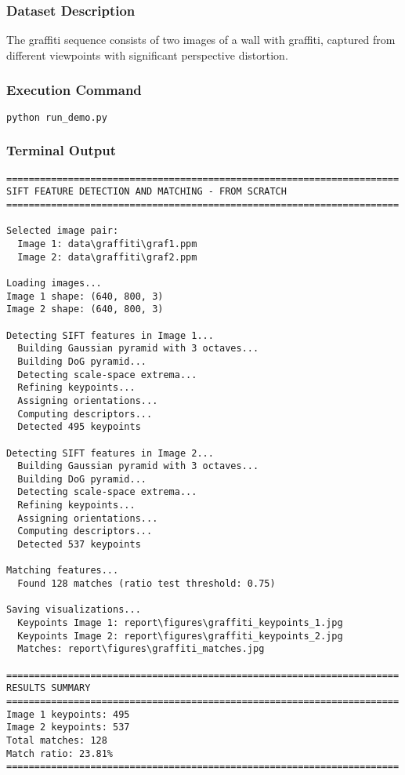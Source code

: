 \documentclass[12pt,a4paper]{article}
\begin{document}
\subsubsection{Dataset Description}
The graffiti sequence consists of two images of a wall with graffiti, captured from different viewpoints with significant perspective distortion.

\subsubsection{Execution Command}
\begin{lstlisting}[language=bash]
python run_demo.py
\end{lstlisting}

\subsubsection{Terminal Output}
\begin{lstlisting}
======================================================================
SIFT FEATURE DETECTION AND MATCHING - FROM SCRATCH
======================================================================

Selected image pair:
  Image 1: data\graffiti\graf1.ppm
  Image 2: data\graffiti\graf2.ppm

Loading images...
Image 1 shape: (640, 800, 3)
Image 2 shape: (640, 800, 3)

Detecting SIFT features in Image 1...
  Building Gaussian pyramid with 3 octaves...
  Building DoG pyramid...
  Detecting scale-space extrema...
  Refining keypoints...
  Assigning orientations...
  Computing descriptors...
  Detected 495 keypoints

Detecting SIFT features in Image 2...
  Building Gaussian pyramid with 3 octaves...
  Building DoG pyramid...
  Detecting scale-space extrema...
  Refining keypoints...
  Assigning orientations...
  Computing descriptors...
  Detected 537 keypoints

Matching features...
  Found 128 matches (ratio test threshold: 0.75)

Saving visualizations...
  Keypoints Image 1: report\figures\graffiti_keypoints_1.jpg
  Keypoints Image 2: report\figures\graffiti_keypoints_2.jpg
  Matches: report\figures\graffiti_matches.jpg

======================================================================
RESULTS SUMMARY
======================================================================
Image 1 keypoints: 495
Image 2 keypoints: 537
Total matches: 128
Match ratio: 23.81%
======================================================================
\end{lstlisting}
\end{document}

